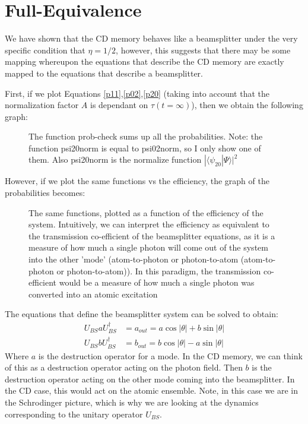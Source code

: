 \documentclass[12pt]{article}
\begin{document}
\section{Full-Equivalence}
We have shown that the CD memory behaves like a beamsplitter under the very specific condition that $\eta = 1/2$, however, this suggests that there may be some mapping whereupon the equations that describe the CD memory are exactly mapped to the equations that describe a beamsplitter. 

First, if we plot Equations \eqref{p11},\eqref{p02},\eqref{p20} (taking into account that the normalization factor $A$ is dependant on $\tau(t=\infty)$), then we obtain the following graph:
\begin{figure}[H]
\caption{The function prob-check sums up all the probabilities. Note: the function psi20norm is equal to psi02norm, so I only show one of them. Also psi20norm is the normalize function $|\langle \psi_20 | \Psi \rangle|^2$}

\end{figure}

However, if we plot the same functions vs the efficiency, the graph of the probabilities becomes:
\begin{figure}[H]
\caption{The same functions, plotted as a function of the efficiency of the system. Intuitively, we can interpret the efficiency as equivalent to the transmission co-efficient of the beamsplitter equations, as it is a measure of how much a single photon will come out of the system into the other 'mode' (atom-to-photon or photon-to-atom (atom-to-photon or photon-to-atom)). In this paradigm, the transmission co-efficient would be a measure of how much a single photon was converted into an atomic excitation}

\end{figure}

The equations that define the beamsplitter system can be solved to obtain:
\begin{align}
U_{BS} a U^\dagger_{BS} &= a_{out}= a \cos  |\theta| + b \sin| \theta|\\
U_{BS} b U^\dagger_{BS} &= b_{out}=b \cos  |\theta| - a \sin| \theta|
\end{align}
Where $a$ is the destruction operator for a mode. In the CD memory, we can think of this as a destruction operator acting on the photon field. Then $b$ is the destruction operator acting on the other mode coming into the beamsplitter. In the CD case, this would act on the atomic ensemble. Note, in this case we are in the Schrodinger picture, which is why we are looking at the dynamics corresponding to the unitary operator $U_{BS}$.
\end{document}
